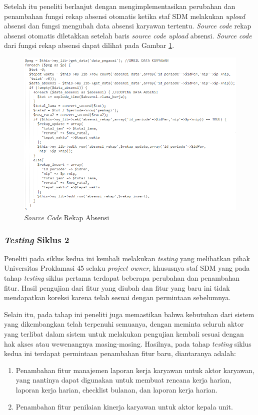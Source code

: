 	Setelah itu peneliti berlanjut dengan mengimplementasikan perubahan dan penambahan fungsi rekap absensi otomatis ketika staf SDM melakukan \emph{upload} absensi dan fungsi mengubah data absensi karyawan tertentu. \emph{Source code} rekap absensi otomatis diletakkan setelah baris \emph{source code upload} absensi. \emph{Source code} dari fungsi rekap absensi dapat dilihat pada Gambar \ref{coding_rekap_absensi}.
	\begin{figure}[H]
	    \centering            		    \includegraphics[width=14cm]{gambar/coding/rekap-absensi}
	    \caption{\emph{Source Code} Rekap Absensi}
	    \label{coding_rekap_absensi}
    \end{figure}
	
	\subsubsection{\emph{Testing} Siklus 2}
	Peneliti pada siklus kedua ini kembali melakukan \emph{testing} yang melibatkan pihak Universitas Proklamasi 45 selaku \emph{project owner}, khususnya staf SDM yang pada tahap \emph{testing} siklus pertama terdapat beberapa perubahan dan penambahan fitur. Hasil pengujian dari fitur yang diubah dan fitur yang baru ini tidak mendapatkan koreksi karena telah sesuai dengan permintaan sebelumnya.
	
	Selain itu, pada tahap ini peneliti juga memastikan bahwa kebutuhan dari sistem yang dikembangkan telah terpenuhi semuanya, dengan meminta seluruh aktor yang terlibat dalam sistem untuk melakukan pengujian kembali sesuai dengan hak akses atau wewenangnya masing-masing. Hasilnya, pada tahap \emph{testing} siklus kedua ini terdapat permintaan penambahan fitur baru, diantaranya adalah:
	\begin{enumerate}
	    \itemsep0em
	    \item Penambahan fitur manajemen laporan kerja karyawan untuk aktor karyawan, yang nantinya dapat digunakan untuk membuat rencana kerja harian, laporan kerja harian, checklist bulanan, dan laporan kerja harian.
	    \item Penambahan fitur penilaian kinerja karyawan untuk aktor kepala unit.
	\end{enumerate}
	

